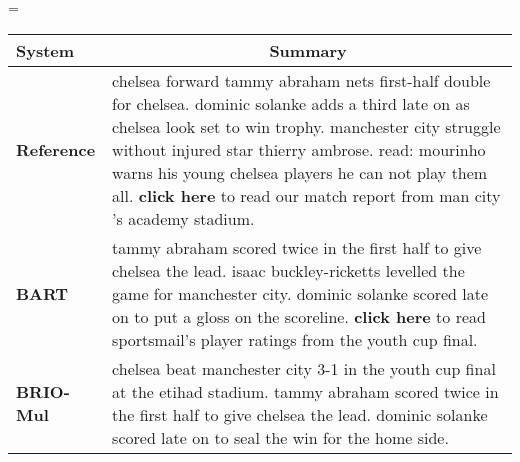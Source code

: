 \documentclass[11pt]{article}
\newcommand{\model}{BRIO\xspace}
\begin{document}
\begin{table*}[t!]
    \scriptsize
    \centering
    \extrarowheight=\aboverulesep
    \addtolength{\extrarowheight}{\belowrulesep}
    \aboverulesep=0pt
    \belowrulesep=0pt
    \begin{tabular}{@{} c  p{}}
     \toprule
\multicolumn{1}{l}{ \bf System} &  \multicolumn{1}{c}{ \bf Summary} \\\midrule
     \multicolumn{1}{l}{ \bf Reference} & \cellcolor{gray!25} chelsea forward tammy abraham nets first-half double for chelsea. dominic solanke adds a third late on as chelsea look set to win trophy. manchester city struggle without injured star thierry ambrose. read: mourinho warns his young chelsea players he can not play them all. \textbf{click here} to read our match report from man city 's academy stadium. \\
     \multicolumn{1}{l}{ \bf BART} & tammy abraham scored twice in the first half to give chelsea the lead. isaac buckley-ricketts levelled the game for manchester city. dominic solanke scored late on to put a gloss on the scoreline. \textbf{click here} to read sportsmail's player ratings from the youth cup final. \\
    \multicolumn{1}{l}{ \bf \model-Mul }& \cellcolor{gray!25} chelsea beat manchester city 3-1 in the youth cup final at the etihad stadium. tammy abraham scored twice in the first half to give chelsea the lead. dominic solanke scored late on to seal the win for the home side. \\
   

\end{tabular}
\end{table*}
\end{document}
